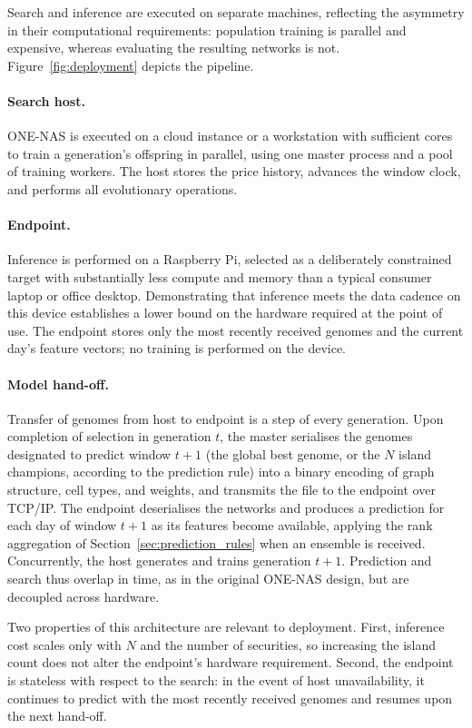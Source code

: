 Search and inference are executed on separate machines, reflecting the
asymmetry in their computational requirements: population training is
parallel and expensive, whereas evaluating the resulting networks is
not. Figure~\ref{fig:deployment} depicts the pipeline.

\paragraph{Search host.} ONE-NAS is executed on a cloud instance or a
workstation with sufficient cores to train a generation's offspring in
parallel, using one master process and a pool of training workers. The
host stores the price history, advances the window clock, and performs
all evolutionary operations.

\paragraph{Endpoint.} Inference is performed on a Raspberry Pi,
selected as a deliberately constrained target with substantially less
compute and memory than a typical consumer laptop or office desktop.
Demonstrating that inference meets the data cadence on this device
establishes a lower bound on the hardware required at the point of use.
The endpoint stores only the most recently received genomes and the
current day's feature vectors; no training is performed on the device.

\paragraph{Model hand-off.} Transfer of genomes from host to endpoint is
a step of every generation. Upon completion of selection in generation
$t$, the master serialises the genomes designated to predict window
$t{+}1$ (the global best genome, or the $N$ island champions, according
to the prediction rule) into a binary encoding of graph structure, cell
types, and weights, and transmits the file to the endpoint over TCP/IP.
The endpoint deserialises the networks and produces a prediction for
each day of window $t{+}1$ as its features become available, applying
the rank aggregation of Section~\ref{sec:prediction_rules} when an
ensemble is received. Concurrently, the host generates and trains
generation $t{+}1$. Prediction and search thus overlap in time, as in
the original ONE-NAS design, but are decoupled across hardware.

Two properties of this architecture are relevant to deployment. First,
inference cost scales only with $N$ and the number of securities, so
increasing the island count does not alter the endpoint's hardware
requirement. Second, the endpoint is stateless with respect to the
search: in the event of host unavailability, it continues to predict
with the most recently received genomes and resumes upon the next
hand-off.